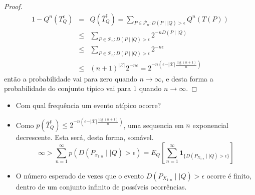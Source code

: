 \begin{frame}[allowframebreaks]
  \framebreak

  \begin{proof}
  \begin{eqnarray}
  1 - Q^{n}(T^{\epsilon}_Q) &=& Q(\overline{T}^{\epsilon}_Q) = \sum_{P \in \mathcal{P}_n : D(P \mid\mid Q) > \epsilon} Q^n (T(P)) \nonumber \\
	&\leq& \sum_{P \in \mathcal{P}_n : D(P \mid\mid Q) > \epsilon} 2^{-n D(P\mid\mid Q)} \nonumber \\
	&\leq& \sum_{P \in \mathcal{P}_n : D(P \mid\mid Q) > \epsilon} 2^{-n \epsilon} \nonumber \\
	&\leq& (n+1)^{\vert \mathcal{X}  \vert} 2^{-n \epsilon} = 2^{-n \left( \epsilon - \vert \mathcal{X} \vert \frac{\log (n+1)}{n}  \right)}
  \end{eqnarray}
  então a probabilidade vai para zero quando $n \rightarrow \infty$, e desta forma a probabilidade do conjunto típico vai para $1$ quando $n \rightarrow \infty$.
  \end{proof}

  \framebreak

  \begin{itemize}
  \item Com qual frequência um evento atípico ocorre?
  \item Como $p(\overline{T}^{\epsilon}_Q) \leq 2^{-n \left( \epsilon - \vert \mathcal{X} \vert \frac{\log (n+1)}{n}  \right)}$, uma 
	sequencia em $n$ exponencial decrescente. Esta será, desta forma, somável.
	\begin{equation}
	\infty > \sum_{n=1}^{\infty} p(D(P_{x_{1:n}} \mid\mid Q) > \epsilon) = E_Q \left[ \sum_{n=1}^{\infty} \mathbf{1}_{\{ D(P_{X_{1:n}} \mid\mid Q) > \epsilon \}}  \right]
	\end{equation}
  \item O número esperado de vezes que o evento $D(P_{X_{1:n}} \mid\mid Q) > \epsilon$ ocorre é finito, dentro de um conjunto infinito de possíveis ocorrências.
  \end{itemize}
\end{frame}




